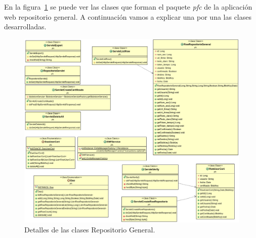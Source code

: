 En la figura~\ref{fig:clasesReposotorioGeneral} se puede ver las clases que forman el paquete \textit{pfc} de la aplicación web repositorio general. A continuación vamos a explicar una por una las clases desarrolladas.

\begin{figure}[h]
  \centering
    \includegraphics[scale=0.4]{./GoogleAppEngine/imagenes/UML_repositorio.png}
  \caption{Detalles de las clases Repositorio General.}
  \label{fig:clasesReposotorioGeneral}
\end{figure}


